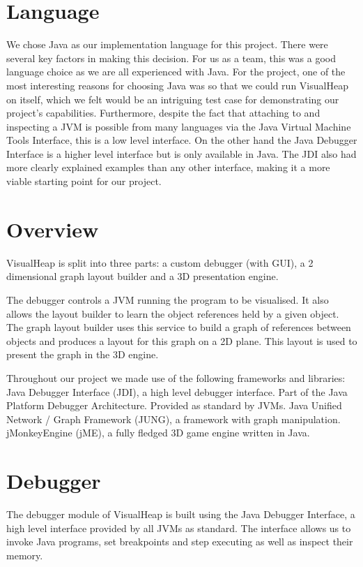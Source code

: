 \documentclass[11pt, a4paper]{report}
\begin{document}
\section{Language}

We chose Java as our implementation language for this project. There were several key factors in making this decision. For us as a team, this was a good language choice as we are all experienced with Java. For the project, one of the most interesting reasons for choosing Java was so that we could run VisualHeap on itself, which we felt would be an intriguing test case for demonstrating our project’s capabilities. Furthermore, despite the fact that attaching to and inspecting a JVM is possible from many languages via the Java Virtual Machine Tools Interface, this is a low level interface. On the other hand the Java Debugger Interface is a higher level interface but is only available in Java. The JDI also had more clearly explained examples than any other interface, making it a more viable starting point for our project.

\section{Overview}

VisualHeap is split into three parts: a custom debugger (with GUI), a 2 dimensional graph layout builder and a 3D presentation engine.

The debugger controls a JVM running the program to be visualised. It also allows the layout builder to learn the object references held by a given object. The graph layout builder uses this service to build a graph of references between objects and produces a layout for this graph on a 2D plane. This layout is used to present the graph in the 3D engine.

Throughout our project we made use of the following frameworks and libraries:     
Java Debugger Interface (JDI), a high level debugger interface. Part of the Java Platform Debugger Architecture. Provided as standard by JVMs.
Java Unified Network / Graph Framework (JUNG), a framework with graph manipulation.
jMonkeyEngine (jME), a fully fledged 3D game engine written in Java.

\section{Debugger}

The debugger module of VisualHeap is built using the Java Debugger Interface, a high level interface provided by all JVMs as standard. The interface allows us to invoke Java programs, set breakpoints and step executing as well as inspect their memory.
\end{document}
